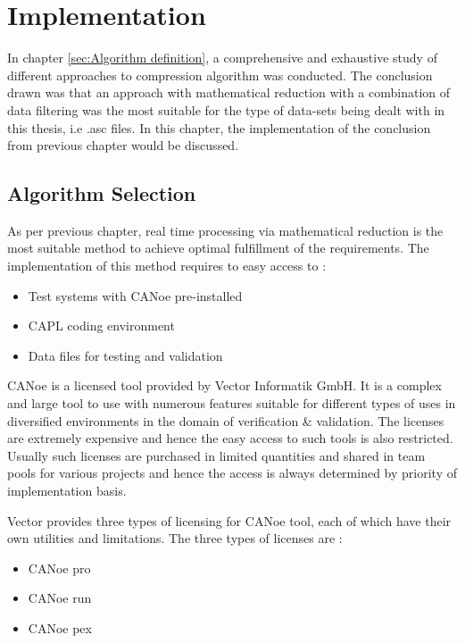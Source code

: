 \section{Implementation}
In chapter \ref{sec:Algorithm definition}, a comprehensive and exhaustive study of different approaches to compression algorithm was conducted. The conclusion drawn was that an approach with mathematical reduction with a combination of data filtering was the most suitable for the type of data-sets being dealt with in this thesis, i.e .asc files. In this chapter, the implementation of the conclusion from previous chapter would be discussed.

\subsection{Algorithm Selection}
As per previous chapter, real time processing via mathematical reduction is the most suitable method to achieve optimal fulfillment of the requirements. The implementation of this method requires to easy access to :
\begin{itemize}
    \item Test systems with CANoe pre-installed
    \item CAPL coding environment
    \item Data files for testing and validation
\end{itemize}

CANoe is a licensed tool provided by Vector Informatik GmbH. It is a complex and large tool to use with numerous features suitable for different types of uses in diversified environments in the domain of verification \& validation. The licenses are extremely expensive and hence the easy access to such tools is also restricted. Usually such licenses are purchased in limited quantities and shared in team pools for various projects and hence the access is always determined by priority of implementation basis. 

Vector provides three types of licensing for CANoe tool, each of which have their own utilities and limitations. The three types of licenses are :

\begin{itemize}
    \item CANoe pro
    \item CANoe run
    \item CANoe pex
\end{itemize}


